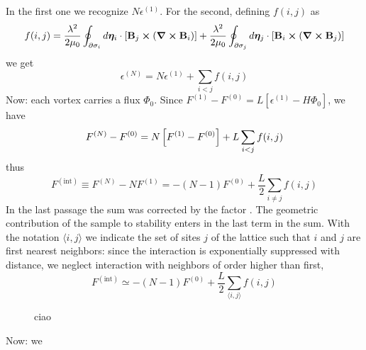 In the first one we recognize $N\epsilon^{(1)}$. For the second, defining $f(i,j)$ as
\[
	f(i,j) = \frac{\lambda^2}{2\mu_0} \oint_{\partial\sigma_i} d\bm\eta_i \cdot \left[{ \mathbf{B}_j \bm{\times} \left({\curl\mathbf{B}_i }\right) }\right] + \frac{\lambda^2}{2\mu_0} \oint_{\partial\sigma_j} d\bm\eta_j \cdot \left[{ \mathbf{B}_i \bm{\times} \left({\curl\mathbf{B}_j }\right) }\right]
\]
we get
\[
	\epsilon^{(N)} = N\epsilon^{(1)} + \sum_{i<j} f(i,j)
\]
Now: each vortex carries a flux $\Phi_0$. Since $F^{(1)} - F^{(0)} = L[ \epsilon^{(1)}-H\Phi_0 ]$, we have
\[
	F^{(N)} - F^{(0)} = N \left[{F^{(1)} - F^{(0)}}\right] + L \sum_{i<j} f(i,j)
\]
thus
\[
	F^{(\mathrm{int})} \equiv F^{(N)} - N F^{(1)} = - (N-1) F^{(0)} + \frac{L}{2} \sum_{i\neq j} f(i,j)
\]
In the last passage the sum was corrected by the factor \half.
The geometric contribution of the sample to stability enters in the last term in the sum. With the notation $\langle i,j \rangle$ we indicate the set of sites $j$ of the lattice such that $i$ and $j$ are first nearest neighbors: since the interaction is exponentially suppressed with distance, we neglect interaction with neighbors of order higher than first,
\[
	F^{(\mathrm{int})} \simeq - (N-1) F^{(0)} + \frac{L}{2} \sum_{\langle i,j \rangle} f(i,j)
\]

\begin{figure}
	\centering
	\subfloat[][ciao]{\label{subfig:square lattice}}
	\subfloat[][ciao]{\label{subfig:triangular lattice}}
	\caption{ciao}
	\label{fig:lattices}
\end{figure}

Now: we